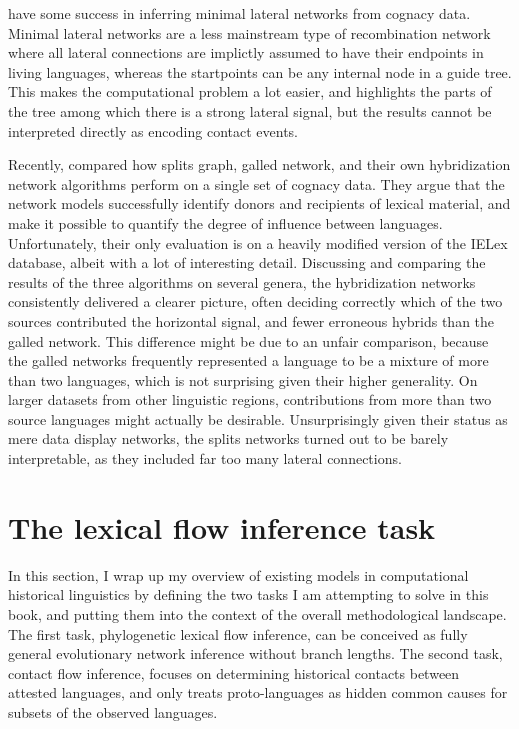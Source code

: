 \citet{list_ea_2014} have some success in inferring minimal lateral networks from cognacy data. Minimal lateral networks are a less mainstream type of recombination network where all lateral connections are implictly assumed to have their endpoints in living languages, whereas the startpoints can be any internal node in a guide tree. This makes the computational problem a lot easier, and highlights the parts of the tree among which there is a strong lateral signal, but the results cannot be interpreted directly as encoding contact events.

Recently, \citet{willems_ea_2016} compared how splits graph, galled network, and their own hybridization network algorithms perform on a single set of cognacy data. They argue that the network models successfully identify donors and recipients of lexical material, and make it possible to quantify the degree of influence between languages. Unfortunately, their only evaluation is on a heavily modified version of the IELex database, albeit with a lot of interesting detail. Discussing and comparing the results of the three algorithms on several genera, the hybridization networks consistently delivered a clearer picture, often deciding correctly which of the two sources contributed the horizontal signal, and fewer erroneous hybrids than the galled network. This difference might be due to an unfair comparison, because the galled networks frequently represented a language to be a mixture of more than two languages, which is not surprising given their higher generality. On larger datasets from other linguistic regions, contributions from more than two source languages might actually be desirable. Unsurprisingly given their status as mere data display networks, the splits networks turned out to be barely interpretable, as they included far too many lateral connections. 

\section{The lexical flow inference task}
In this section, I wrap up my overview of existing models in computational historical linguistics by defining the two tasks I am attempting to solve in this book, and putting them into the context of the overall methodological landscape. The first task, phylogenetic lexical flow inference, can be conceived as fully general evolutionary network inference without branch lengths. The second task, contact flow inference, focuses on determining historical contacts between attested languages, and only treats proto-languages as hidden common causes for subsets of the observed languages.

